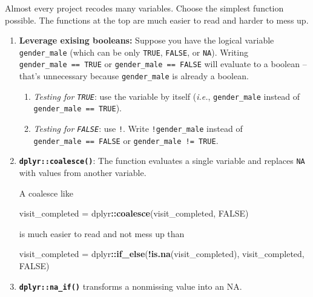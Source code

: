\documentclass[
]{book}
\newenvironment{Shaded}{\begin{snugshade}}{\end{snugshade}}
\newcommand{\KeywordTok}[1]{\textcolor[rgb]{0.13,0.29,0.53}{\textbf{#1}}}
\newcommand{\NormalTok}[1]{#1}
\newcommand{\OperatorTok}[1]{\textcolor[rgb]{0.81,0.36,0.00}{\textbf{#1}}}
\newcommand{\OtherTok}[1]{\textcolor[rgb]{0.56,0.35,0.01}{#1}}
\newcommand{\StringTok}[1]{\textcolor[rgb]{0.31,0.60,0.02}{#1}}
\begin{document}
Almost every project recodes many variables. Choose the simplest function possible. The functions at the top are much easier to read and harder to mess up.

\begin{enumerate}
\def\labelenumi{\arabic{enumi}.}
\item
  \textbf{Leverage exising booleans:} Suppose you have the logical variable \texttt{gender\_male} (which can be only \texttt{TRUE}, \texttt{FALSE}, or \texttt{NA}). Writing \texttt{gender\_male\ ==\ TRUE} or \texttt{gender\_male\ ==\ FALSE} will evaluate to a boolean --that's unnecessary because \texttt{gender\_male} is already a boolean.

  \begin{enumerate}
  \def\labelenumii{\arabic{enumii}.}
  \item
    \emph{Testing for \texttt{TRUE}}: use the variable by itself (\emph{i.e.}, \texttt{gender\_male} instead of \texttt{gender\_male\ ==\ TRUE}).
  \item
    \emph{Testing for \texttt{FALSE}}: use \texttt{!}. Write \texttt{!gender\_male} instead of \texttt{gender\_male\ ==\ FALSE} or \texttt{gender\_male\ !=\ TRUE}.
  \end{enumerate}
\item
  \textbf{\texttt{dplyr::coalesce()}}: The function evaluates a single variable and replaces \texttt{NA} with values from another variable.

  A coalesce like

\begin{Shaded}
\begin{Highlighting}[]
\NormalTok{visit\_completed =}\StringTok{ }\NormalTok{dplyr}\OperatorTok{::}\KeywordTok{coalesce}\NormalTok{(visit\_completed, }\OtherTok{FALSE}\NormalTok{)}
\end{Highlighting}
\end{Shaded}

  is much easier to read and not mess up than

\begin{Shaded}
\begin{Highlighting}[]
\NormalTok{visit\_completed =}\StringTok{ }\NormalTok{dplyr}\OperatorTok{::}\KeywordTok{if\_else}\NormalTok{(}\OperatorTok{!}\KeywordTok{is.na}\NormalTok{(visit\_completed), visit\_completed, }\OtherTok{FALSE}\NormalTok{)}
\end{Highlighting}
\end{Shaded}
\item
  \textbf{\texttt{dplyr::na\_if()}} transforms a nonmissing value into an NA.


\end{enumerate}
\end{document}

